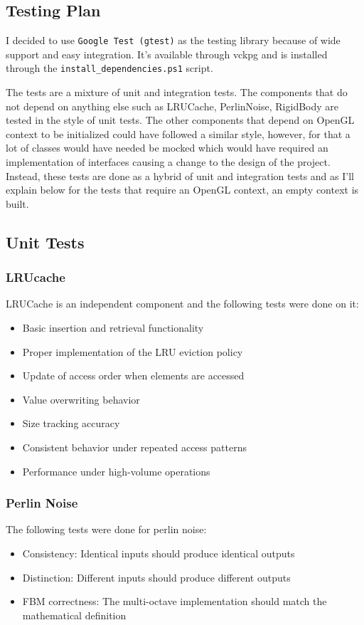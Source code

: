 \subsection{Testing Plan}

I decided to use \texttt{Google Test (gtest)} as the testing library because of wide support and easy integration. It's available through vckpg and is installed through the \texttt{install\_dependencies.ps1} script.

The tests are a mixture of unit and integration tests. The components that do not depend on anything else such as LRUCache, PerlinNoise, RigidBody are tested in the style of unit tests. The other components that depend on OpenGL context to be initialized could have followed a similar style, however, for that a lot of classes would have needed be mocked which would have required an implementation of interfaces causing a change to the design of the project. Instead, these tests are done as a hybrid of unit and integration tests and as I'll explain below for the tests that require an OpenGL context, an empty context is built.

\subsection{Unit Tests}
\subsubsection{LRUcache}
LRUCache is an independent component and the following tests were done on it: 
\begin{itemize}
    \item Basic insertion and retrieval functionality
    \item Proper implementation of the LRU eviction policy
    \item Update of access order when elements are accessed
    \item Value overwriting behavior
    \item Size tracking accuracy
    \item Consistent behavior under repeated access patterns
    \item Performance under high-volume operations
\end{itemize}

\subsubsection{Perlin Noise}
The following tests were done for perlin noise:
\begin{itemize}
    \item Consistency: Identical inputs should produce identical outputs
    \item Distinction: Different inputs should produce different outputs
    \item FBM correctness: The multi-octave implementation should match the mathematical definition
\end{itemize}

